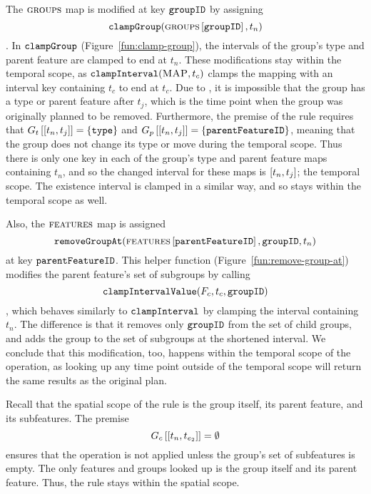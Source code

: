    The $\textsc{groups}{}{}$ map is modified at key $\texttt{groupID}$ by assigning 
   $$\texttt{clampGroup}(\textsc{groups}{} \left[ \texttt{groupID} \right], t_n)$$
   . In $\texttt{clampGroup}$ (Figure~\vref{fun:clamp-group}), the intervals of the group's type and parent feature are clamped to end at $t_n$. These modifications stay within the temporal scope, as $\texttt{clampInterval}(\textsc{MAP}, t_c)$ clamps the mapping with an interval key containing $t_c$ to end at $t_c$. Due to , it is impossible that the group has a type or parent feature after $t_j$, which is the time point when the group was originally planned to be removed. Furthermore, the premise of the rule requires that $\lookup{G_t}{\interval{t_n}{t_j}} = \set{\var{type}}$ and $\lookup{G_p}{\interval{t_n}{t_j}} = \set{\var{parentFeatureID}}$, meaning that the group does not change its type or move during the temporal scope. Thus there is only one key in each of the group's type and parent feature maps containing $t_n$, and so the changed interval for these maps is $\interval{t_n}{t_j}$; the temporal scope. The existence interval is clamped in a similar way, and so stays within the temporal scope as well.

   Also, the $\textsc{features}{}$ map is assigned $$\texttt{removeGroupAt}(\textsc{features} \left[ \texttt{parentFeatureID} \right], \texttt{groupID}, t_n)$$ at key $\texttt{parentFeatureID}$. This helper function (Figure~\vref{fun:remove-group-at}) modifies the parent feature's set of subgroups by calling $$\texttt{clampIntervalValue}(F_c, t_c, \texttt{groupID})$$, which behaves similarly to $\texttt{clampInterval}$ by clamping the interval containing $t_n$. The difference is that it removes only $\texttt{groupID}$ from the set of child groups, and adds the group to the set of subgroups at the shortened interval. We conclude that this modification, too, happens within the temporal scope of the operation, as looking up any time point outside of the temporal scope will return the same results as the original plan.

   Recall that the spatial scope of the rule is the group itself, its parent feature, and its subfeatures. The premise
\begin{equation*}
   \lookup{G_c}{\interval{t_n}{t_{e_2}}} = \emptyset
\end{equation*}
   ensures that the operation is not applied unless the group's set of subfeatures is empty. The only features and groups looked up is the group itself and its parent feature. Thus, the rule stays within the spatial scope.
 \\

